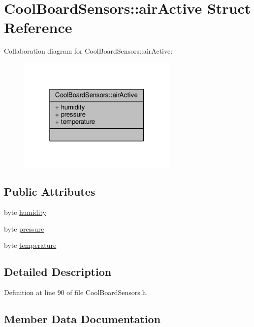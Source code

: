 \hypertarget{structCoolBoardSensors_1_1airActive}{}\section{Cool\+Board\+Sensors\+:\+:air\+Active Struct Reference}
\label{structCoolBoardSensors_1_1airActive}


Collaboration diagram for Cool\+Board\+Sensors\+:\+:air\+Active\+:
\nopagebreak
\begin{figure}[H]
\begin{center}
\leavevmode
\includegraphics[width=223pt]{structCoolBoardSensors_1_1airActive__coll__graph}
\end{center}
\end{figure}
\subsection*{Public Attributes}
\begin{DoxyCompactItemize}
\item 
byte \hyperlink{structCoolBoardSensors_1_1airActive_ae5740445054b27415e22f450576accb7}{humidity}
\item 
byte \hyperlink{structCoolBoardSensors_1_1airActive_ab200826a70d1dc9945f5efb6b9c732ed}{pressure}
\item 
byte \hyperlink{structCoolBoardSensors_1_1airActive_a9a6633c426b0508e30ebc1832ec6d745}{temperature}
\end{DoxyCompactItemize}


\subsection{Detailed Description}


Definition at line 90 of file Cool\+Board\+Sensors.\+h.



\subsection{Member Data Documentation}
\mbox{\label{structCoolBoardSensors_1_1airActive_ae5740445054b27415e22f450576accb7}} 
